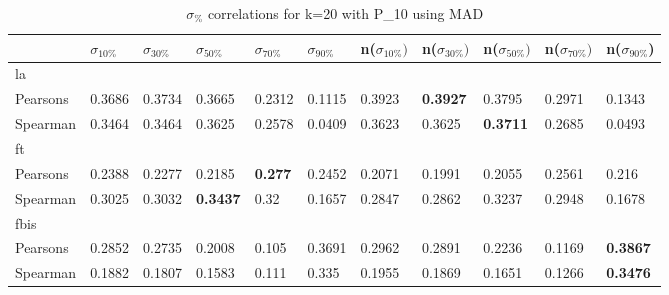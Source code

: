 \documentclass{sig-alternate}
\begin{document}
\begin{table}[h!]
\centering
\begin{tabular}{|l||l|l|l|l|l||l|l|l|l|l|}
\hline
& $\sigma_{10\%}$ & $\sigma_{30\%}$ & $\sigma_{50\%}$ & $\sigma_{70\%}$ & $\sigma_{90\%}$ & n($\sigma_{10\%})$ & n($\sigma_{30\%})$ & n($\sigma_{50\%})$ & n($\sigma_{70\%})$ & n($\sigma_{90\%}$) \\ \hline
\hline la &  &  &  &  &  &  &  &  &  &  \\ \hline
Pearsons & 0.3686 & 0.3734 & 0.3665 & 0.2312 & 0.1115 & 0.3923 & \textbf{0.3927} & 0.3795 & 0.2971 & 0.1343 \\ \hline
Spearman & 0.3464 & 0.3464 & 0.3625 & 0.2578 & 0.0409 & 0.3623 & 0.3625 & \textbf{0.3711} & 0.2685 & 0.0493 \\ \hline
\hline ft &  &  &  &  &  &  &  &  &  &  \\ \hline
Pearsons & 0.2388 & 0.2277 & 0.2185 & \textbf{0.277} & 0.2452 & 0.2071 & 0.1991 & 0.2055 & 0.2561 & 0.216 \\ \hline
Spearman & 0.3025 & 0.3032 & \textbf{0.3437} & 0.32 & 0.1657 & 0.2847 & 0.2862 & 0.3237 & 0.2948 & 0.1678 \\ \hline
\hline fbis &  &  &  &  &  &  &  &  &  &  \\ \hline
Pearsons & 0.2852 & 0.2735 & 0.2008 & 0.105 & 0.3691 & 0.2962 & 0.2891 & 0.2236 & 0.1169 & \textbf{0.3867} \\ \hline
Spearman & 0.1882 & 0.1807 & 0.1583 & 0.111 & 0.335 & 0.1955 & 0.1869 & 0.1651 & 0.1266 & \textbf{0.3476} \\ \hline
\end{tabular}
\caption{$\sigma_{\%}$ correlations for k=20 with P\_10 using MAD}
\end{table}
\end{document}
